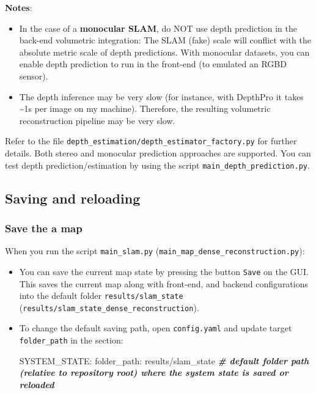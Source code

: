 \documentclass{article}
\newenvironment{Shaded}{\begin{snugshade}}{\end{snugshade}}
\newcommand{\CommentTok}[1]{\textcolor[rgb]{0.00,0.40,1.00}{\textbf{\textit{#1}}}}
\newcommand{\ExtensionTok}[1]{\textcolor[rgb]{0.74,0.68,0.62}{#1}}
\newcommand{\NormalTok}[1]{\textcolor[rgb]{0.74,0.68,0.62}{#1}}
\begin{document}
\textbf{Notes}: 
\begin{itemize}
\item In the case of a \textbf{monocular SLAM}, do NOT use
depth prediction in the back-end volumetric integration: The SLAM (fake)
scale will conflict with the absolute metric scale of depth predictions.
With monocular datasets, you can enable depth prediction to run in the
front-end (to emulated an RGBD sensor). 
\item The depth inference may be
very slow (for instance, with DepthPro it takes \textasciitilde{}1s per
image on my machine). Therefore, the resulting volumetric reconstruction
pipeline may be very slow.
\end{itemize}

Refer to the file
\texttt{depth\_estimation/depth\_estimator\_factory.py} for further
details. Both stereo and monocular prediction approaches are supported.
You can test depth prediction/estimation by using the script
\texttt{main\_depth\_prediction.py}.

\hypertarget{saving-and-reloading}{%
\subsection{Saving and reloading}\label{saving-and-reloading}}

\hypertarget{save-the-a-map}{%
\subsubsection{Save the a map}\label{save-the-a-map}}

When you run the script \texttt{main\_slam.py}
(\texttt{main\_map\_dense\_reconstruction.py}): 
\begin{itemize}
\item You can save the
current map state by pressing the button \texttt{Save} on the GUI. This
saves the current map along with front-end, and backend configurations
into the default folder \texttt{results/slam\_state}
(\texttt{results/slam\_state\_dense\_reconstruction}). 
\item To change the
default saving path, open \texttt{config.yaml} and update target
\texttt{folder\_path} in the section:
\begin{scriptsize}
\begin{Shaded}
\begin{Highlighting}[]
\ExtensionTok{SYSTEM_STATE}\NormalTok{:}
  \ExtensionTok{folder_path}\NormalTok{: results/slam_state   }\CommentTok{# default folder path (relative to repository root) where the system state is saved or reloaded}
\end{Highlighting}
\end{Shaded}
\end{scriptsize}
\end{itemize}
\end{document}
